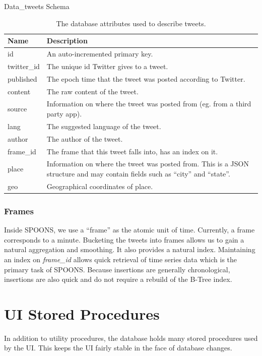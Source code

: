 \documentclass[12pt]{ucthesis}
\begin{document}
\begin{table}
   \begin{center}
      {\Large Data\_tweets Schema}
      \begin{tabular}{|l|p{12cm}|}
         \hline
            Name & Description
         \tabularnewline\hline
            \textsf{id} & An auto-incremented primary key.
         \tabularnewline\hline
            \textsf{twitter\_id} & The unique id Twitter gives to a tweet.
         \tabularnewline\hline
            \textsf{published} & The epoch time that the tweet was posted according to Twitter.
         \tabularnewline\hline
            \textsf{content} & The raw content of the tweet.
         \tabularnewline\hline
            \textsf{source} & Information on where the tweet was posted from (eg. from a third party app).
         \tabularnewline\hline
            \textsf{lang} & The suggested language of the tweet.
         \tabularnewline\hline
            \textsf{author} & The author of the tweet.
         \tabularnewline\hline
            \textsf{frame\_id} & The frame that this tweet falls into, has an index on it.
         \tabularnewline\hline
            \textsf{place} & Information on where the tweet was posted from. This is a JSON structure and may contain fields such as ``city'' and ``state''.
         \tabularnewline\hline
            \textsf{geo} & Geographical coordinates of place.
         \tabularnewline\hline
      \end{tabular}
   \end{center}
   \caption[Database Tweet Attributes]{The database attributes used to describe tweets.}
   \label{table:tweet-attributes}
\end{table}

\subsubsection{Frames}
Inside SPOONS, we use a ``frame'' as the atomic unit of time. Currently, a frame corresponds to a minute. Bucketing the tweets into frames allows us to
gain a natural aggregation and smoothing. It also provides a natural index. Maintaining an index on \textit{frame\_id} allows quick retrieval of
time series data which is the primary task of SPOONS. Because insertions are generally chronological, insertions are also quick and do not require a
rebuild of the B-Tree index\cite{innodb}.

\section{UI Stored Procedures}
\label{arch-database-sp}
In addition to utility procedures, the database holds many stored procedures used by the UI.
This keeps the UI fairly stable in the face of database changes.
\end{document}
